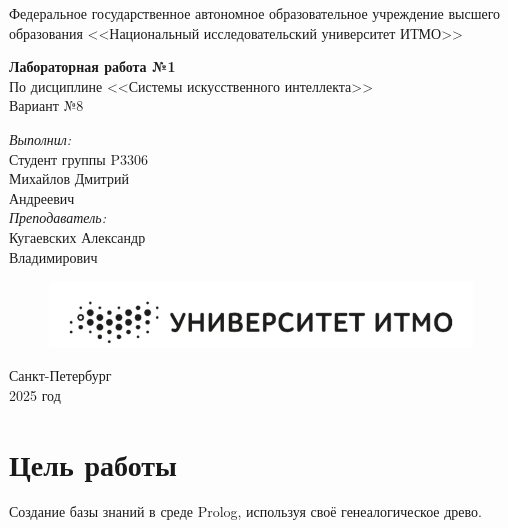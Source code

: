 \documentclass[12pt]{report}
\begin{document}
	
	\begin{titlepage}
		\begin{center}
			\large{Федеральное государственное автономное образовательное учреждение высшего образования <<Национальный исследовательский университет ИТМО>>}
		\end{center}
		
		\vspace{15em}
		
		\begin{center}
			\huge{\textbf{Лабораторная работа №1}} \\
			\large{По дисциплине <<Системы искусственного интеллекта>>} \\
			\large{Вариант №8}
		\end{center}
		
		\vspace{5em}
		
		\begin{flushright}
			\textit{\large{Выполнил:}} \\
			\large{Студент группы P3306} \\
			\large{Михайлов Дмитрий} \\
			\large{Андреевич} \\
			\textit{\large{Преподаватель:}} \\
			\large{Кугаевских Александр} \\
			\large{Владимирович}
		\end{flushright}
		
		\vspace{2cm}
		
		\begin{figure}[h]
			\centering
			\includegraphics[width=0.5\linewidth]{image.png}
		\end{figure}
		
		\begin{center}
			Санкт-Петербург \\
			2025 год
		\end{center}
	\end{titlepage}
	
	\tableofcontents
	\newpage
	
	\section*{Цель работы}
	Создание базы знаний в среде Prolog, используя своё генеалогическое древо.
	
\end{document}
